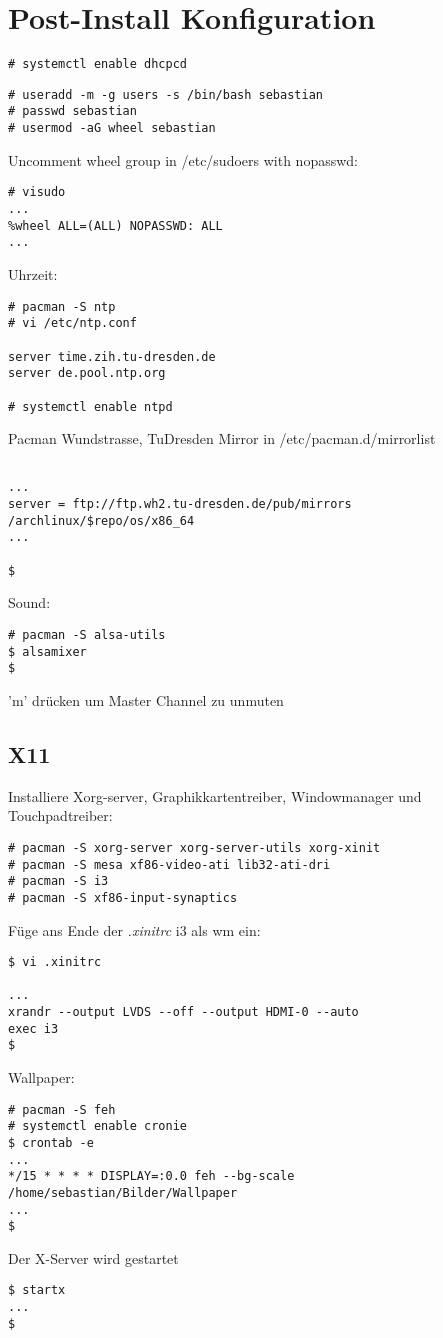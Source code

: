 \section{Post-Install Konfiguration}
\begin{lstlisting}[style=Bash]
# systemctl enable dhcpcd
\end{lstlisting}
\begin{lstlisting}[style=Bash]
# useradd -m -g users -s /bin/bash sebastian 
# passwd sebastian
# usermod -aG wheel sebastian
\end{lstlisting}
Uncomment wheel group in /etc/sudoers with nopasswd:
\begin{lstlisting}[style=Bash]
# visudo 
...
%wheel ALL=(ALL) NOPASSWD: ALL
...

\end{lstlisting}
Uhrzeit:
\begin{lstlisting}[style=Bash]
# pacman -S ntp 
# vi /etc/ntp.conf

server time.zih.tu-dresden.de
server de.pool.ntp.org

# systemctl enable ntpd 
\end{lstlisting}
Pacman Wundstrasse, TuDresden Mirror in /etc/pacman.d/mirrorlist
\begin{lstlisting}[style=Bash]

...
server = ftp://ftp.wh2.tu-dresden.de/pub/mirrors
/archlinux/$repo/os/x86_64
...

$
\end{lstlisting}
Sound:
\begin{lstlisting}[style=Bash]
# pacman -S alsa-utils 
$ alsamixer
$
\end{lstlisting}
'm' drücken um Master Channel zu unmuten

\subsection{X11}
\label{sec:x11}
Installiere Xorg-server, Graphikkartentreiber, Windowmanager und Touchpadtreiber:
\begin{lstlisting}[style=Bash]
# pacman -S xorg-server xorg-server-utils xorg-xinit 
# pacman -S mesa xf86-video-ati lib32-ati-dri
# pacman -S i3
# pacman -S xf86-input-synaptics
\end{lstlisting}
Füge ans Ende der \emph{.xinitrc} i3 als wm ein:
\begin{lstlisting}[style=Bash]
$ vi .xinitrc 

...
xrandr --output LVDS --off --output HDMI-0 --auto
exec i3
$
\end{lstlisting}
Wallpaper: 
\begin{lstlisting}[style=Bash]
# pacman -S feh
# systemctl enable cronie
$ crontab -e
...
*/15 * * * * DISPLAY=:0.0 feh --bg-scale /home/sebastian/Bilder/Wallpaper
...
$
\end{lstlisting}
Der X-Server wird gestartet
\begin{lstlisting}[style=Bash]
$ startx
...
$
\end{lstlisting}
